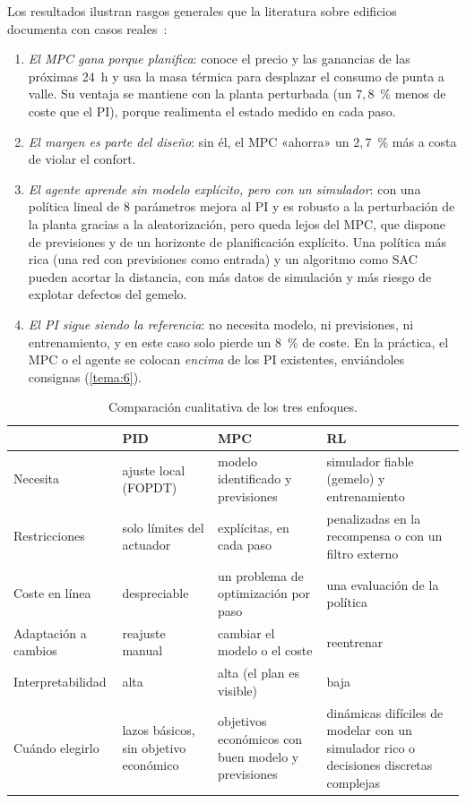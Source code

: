 Los resultados ilustran rasgos generales que la literatura sobre edificios documenta con casos reales~\cite{drgona,wanghong}:
\begin{enumerate}
  \item \emph{El MPC gana porque planifica}: conoce el precio y las ganancias de las próximas 24~h y usa la masa térmica para desplazar el consumo de punta a valle. Su ventaja se mantiene con la planta perturbada (un $7{,}8$~\% menos de coste que el PI), porque realimenta el estado medido en cada paso.
  \item \emph{El margen es parte del diseño}: sin él, el MPC «ahorra» un $2{,}7$~\% más a costa de violar el confort.
  \item \emph{El agente aprende sin modelo explícito, pero con un simulador}: con una política lineal de 8 parámetros mejora al PI y es robusto a la perturbación de la planta gracias a la aleatorización, pero queda lejos del MPC, que dispone de previsiones y de un horizonte de planificación explícito. Una política más rica (una red con previsiones como entrada) y un algoritmo como SAC pueden acortar la distancia, con más datos de simulación y más riesgo de explotar defectos del gemelo.
  \item \emph{El PI sigue siendo la referencia}: no necesita modelo, ni previsiones, ni entrenamiento, y en este caso solo pierde un $8$~\% de coste. En la práctica, el MPC o el agente se colocan \emph{encima} de los PI existentes, enviándoles consignas (\cref{tema:6}).
\end{enumerate}

\begin{table}[htbp]
\centering\small
\begin{tabularx}{\textwidth}{@{}l>{\raggedright\arraybackslash}X>{\raggedright\arraybackslash}X>{\raggedright\arraybackslash}X@{}}
\toprule
& PID & MPC & RL \\
\midrule
Necesita & ajuste local (FOPDT) & modelo identificado y previsiones & simulador fiable (gemelo) y entrenamiento \\
Restricciones & solo límites del actuador & explícitas, en cada paso & penalizadas en la recompensa o con un filtro externo \\
Coste en línea & despreciable & un problema de optimización por paso & una evaluación de la política \\
Adaptación a cambios & reajuste manual & cambiar el modelo o el coste & reentrenar \\
Interpretabilidad & alta & alta (el plan es visible) & baja \\
Cuándo elegirlo & lazos básicos, sin objetivo económico & objetivos económicos con buen modelo y previsiones & dinámicas difíciles de modelar con un simulador rico o decisiones discretas complejas \\
\bottomrule
\end{tabularx}
\caption{Comparación cualitativa de los tres enfoques.}
\label{tab:enfoques}
\end{table}

